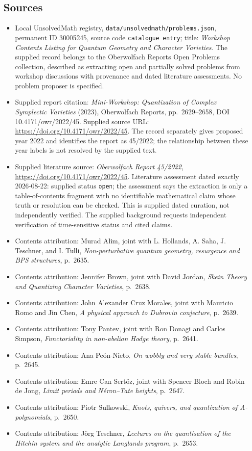 \documentclass[11pt]{article}
\begin{document}
\subsection{Sources}
\begin{itemize}
\item Local UnsolvedMath registry, \texttt{data/unsolvedmath/problems.json}, permanent ID 30005245, source code \texttt{catalogue entry}; title: \emph{Workshop Contents Listing for Quantum Geometry and Character Varieties}. The supplied record belongs to the Oberwolfach Reports Open Problems collection, described as extracting open and partially solved problems from workshop discussions with provenance and dated literature assessments. No problem proposer is specified.
\item Supplied report citation: \emph{Mini-Workshop: Quantization of Complex Symplectic Varieties} (2023), Oberwolfach Reports, pp.\ 2629--2658, DOI 10.4171/owr/2022/45. Supplied source URL: \url{https://doi.org/10.4171/owr/2022/45}. The record separately gives proposed year 2022 and identifies the report as 45/2022; the relationship between these year labels is not resolved by the supplied text.
\item Supplied literature source: \emph{Oberwolfach Report 45/2022}, \url{https://doi.org/10.4171/owr/2022/45}. Literature assessment dated exactly 2026-08-22: supplied status \texttt{open}; the assessment says the extraction is only a table-of-contents fragment with no identifiable mathematical claim whose truth or resolution can be checked. This is supplied dated curation, not independently verified. The supplied background requests independent verification of time-sensitive status and cited claims.
\item Contents attribution: Murad Alim, joint with L. Hollands, A. Saha, J. Teschner, and I. Tulli, \emph{Non-perturbative quantum geometry, resurgence and BPS structures}, p.\ 2635.
\item Contents attribution: Jennifer Brown, joint with David Jordan, \emph{Skein Theory and Quantizing Character Varieties}, p.\ 2638.
\item Contents attribution: John Alexander Cruz Morales, joint with Mauricio Romo and Jin Chen, \emph{A physical approach to Dubrovin conjecture}, p.\ 2639.
\item Contents attribution: Tony Pantev, joint with Ron Donagi and Carlos Simpson, \emph{Functoriality in non-abelian Hodge theory}, p.\ 2641.
\item Contents attribution: Ana Peón-Nieto, \emph{On wobbly and very stable bundles}, p.\ 2645.
\item Contents attribution: Emre Can Sertöz, joint with Spencer Bloch and Robin de Jong, \emph{Limit periods and Néron–Tate heights}, p.\ 2647.
\item Contents attribution: Piotr Sulkowski, \emph{Knots, quivers, and quantization of A-polynomials}, p.\ 2650.
\item Contents attribution: Jörg Teschner, \emph{Lectures on the quantisation of the Hitchin system and the analytic Langlands program}, p.\ 2653.
\end{itemize}
\end{document}
